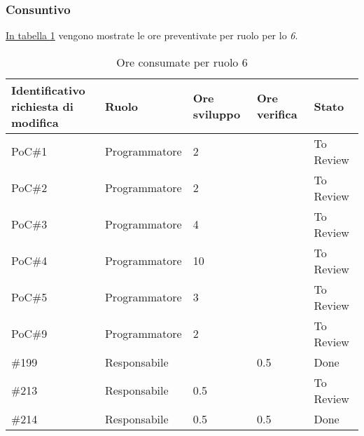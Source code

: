 \subsubsection{Consuntivo}
\hyperref[tab:sprint6_ore_consumate]{In tabella \ref{tab:sprint6_ore_consumate}} vengono mostrate le ore preventivate per ruolo per lo \textit{ 6}.

\begin{table}[H]
    \centering
    \begin{tabular}{| l | l | l | l | l |}
        \hline
            \makecell{\textbf{Identificativo} \\ \textbf{richiesta di modifica}} &
            \textbf{Ruolo} & 
            \textbf{Ore sviluppo} &
            \textbf{Ore verifica} & 
            \textbf{Stato}\\ 
        \hline
        PoC\#1 & Programmatore & 2 &  & To Review\\
        \hline
        PoC\#2 & Programmatore & 2 &  & To Review\\
        \hline
        PoC\#3 & Programmatore & 4 &  & To Review\\
        \hline
        PoC\#4 & Programmatore & 10 &  & To Review\\
        \hline
        PoC\#5 & Programmatore & 3 &  & To Review\\
        \hline
        PoC\#9 & Programmatore & 2 &  & To Review\\
        \hline
        \#199 & Responsabile &  & 0.5 & Done\\
        \hline
        \#213 & Responsabile & 0.5 &  & To Review\\
        \hline
        \#214 & Responsabile & 0.5 & 0.5 & Done\\
        \hline
    \end{tabular}
    \caption{Ore consumate per ruolo  6}
    \label{tab:sprint6_ore_consumate} 
\end{table}